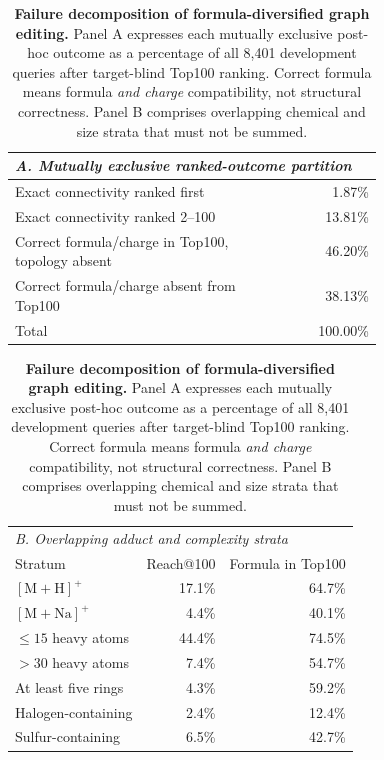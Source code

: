 \begin{table}[!htbp]
\centering
\caption{\textbf{Failure decomposition of formula-diversified graph editing.} Panel A expresses each mutually exclusive post-hoc outcome as a percentage of all 8,401 development queries after target-blind Top100 ranking. Correct formula means formula \emph{and charge} compatibility, not structural correctness. Panel B comprises overlapping chemical and size strata that must not be summed.}
\label{tab:msdev_g90}
\small
\begin{tabular}{p{0.73\linewidth}r}
\toprule
\multicolumn{2}{l}{\textit{A. Mutually exclusive ranked-outcome partition}} \\
\midrule
Exact connectivity ranked first & 1.87\% \\
Exact connectivity ranked 2--100 & 13.81\% \\
Correct formula/charge in Top100, topology absent & 46.20\% \\
Correct formula/charge absent from Top100 & 38.13\% \\
\midrule
Total & 100.00\% \\
\bottomrule
\end{tabular}

\vspace{5pt}
\begin{tabular}{lrr}
\toprule
\multicolumn{3}{l}{\textit{B. Overlapping adduct and complexity strata}} \\
Stratum & Reach@100 & Formula in Top100 \\
\midrule
$[\mathrm{M+H}]^+$ & 17.1\% & 64.7\% \\
$[\mathrm{M+Na}]^+$ & 4.4\% & 40.1\% \\
$\leq15$ heavy atoms & 44.4\% & 74.5\% \\
$>30$ heavy atoms & 7.4\% & 54.7\% \\
At least five rings & 4.3\% & 59.2\% \\
Halogen-containing & 2.4\% & 12.4\% \\
Sulfur-containing & 6.5\% & 42.7\% \\
\bottomrule
\end{tabular}
\end{table}

\clearpage
